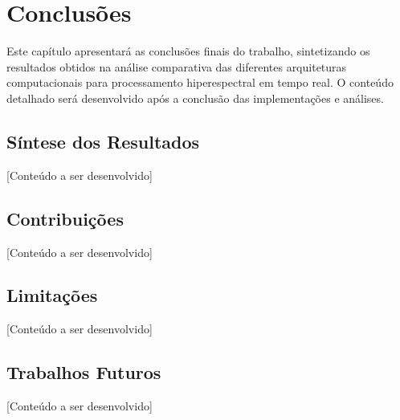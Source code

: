\chapter{Conclusões}\label{chp:conclusoes}

Este capítulo apresentará as conclusões finais do trabalho, sintetizando os resultados obtidos na análise comparativa das diferentes arquiteturas computacionais para processamento hiperespectral em tempo real. O conteúdo detalhado será desenvolvido após a conclusão das implementações e análises.

\section{Síntese dos Resultados}\label{sec:sintese}

[Conteúdo a ser desenvolvido]

\section{Contribuições}\label{sec:contribuicoes}

[Conteúdo a ser desenvolvido]

\section{Limitações}\label{sec:limitacoes}

[Conteúdo a ser desenvolvido]

\section{Trabalhos Futuros}\label{sec:trabalhos_futuros}

[Conteúdo a ser desenvolvido]